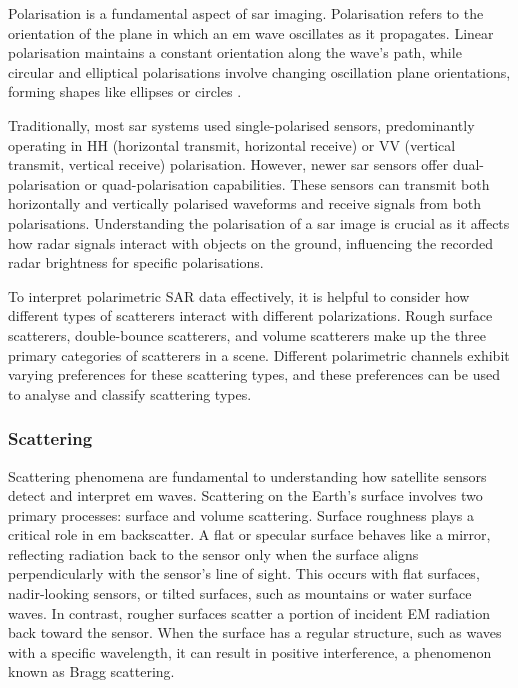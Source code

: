 Polarisation is a fundamental aspect of \acs{sar} imaging. Polarisation refers to the orientation of the plane in which an \acs{em} wave oscillates as it propagates. Linear polarisation maintains a constant orientation along the wave's path, while circular and elliptical polarisations involve changing oscillation plane orientations, forming shapes like ellipses or circles \cite{Meyer2019}.

Traditionally, most \acs{sar} systems used single-polarised sensors, predominantly operating in HH (horizontal transmit, horizontal receive) or VV (vertical transmit, vertical receive) polarisation. However, newer \acs{sar} sensors offer dual-polarisation or quad-polarisation capabilities. These sensors can transmit both horizontally and vertically polarised waveforms and receive signals from both polarisations. Understanding the polarisation of a \acs{sar} image is crucial as it affects how radar signals interact with objects on the ground, influencing the recorded radar brightness for specific polarisations.

To interpret polarimetric SAR data effectively, it is helpful to consider how different types of scatterers interact with different polarizations. Rough surface scatterers, double-bounce scatterers, and volume scatterers make up the three primary categories of scatterers in a scene. Different polarimetric channels exhibit varying preferences for these scattering types, and these preferences can be used to analyse and classify scattering types. 


\subsubsection{Scattering}

Scattering phenomena are fundamental to understanding how satellite sensors detect and interpret \acs{em} waves. Scattering on the Earth's surface involves two primary processes: surface and volume scattering. Surface roughness plays a critical role in \acs{em} backscatter. A flat or specular surface behaves like a mirror, reflecting radiation back to the sensor only when the surface aligns perpendicularly with the sensor's line of sight. This occurs with flat surfaces, nadir-looking sensors, or tilted surfaces, such as mountains or water surface waves. In contrast, rougher surfaces scatter a portion of incident EM radiation back toward the sensor. When the surface has a regular structure, such as waves with a specific wavelength, it can result in positive interference, a phenomenon known as Bragg scattering. %

